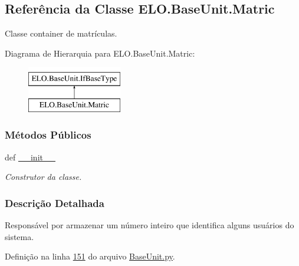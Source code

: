 \hypertarget{classELO_1_1BaseUnit_1_1Matric}{\subsection{Referência da Classe E\-L\-O.\-Base\-Unit.\-Matric}
\label{classELO_1_1BaseUnit_1_1Matric}
}


Classe container de matrículas.  


Diagrama de Hierarquia para E\-L\-O.\-Base\-Unit.\-Matric\-:\begin{figure}[H]
\begin{center}
\leavevmode
\includegraphics[height=2.000000cm]{d6/db2/classELO_1_1BaseUnit_1_1Matric}
\end{center}
\end{figure}
\subsubsection*{Métodos Públicos}
\begin{DoxyCompactItemize}
\item 
def \hyperlink{classELO_1_1BaseUnit_1_1Matric_a050299f6e8d99a530a4598270b93b8d9}{\-\_\-\-\_\-init\-\_\-\-\_\-}
\begin{DoxyCompactList}\small\item\em Construtor da classe. \end{DoxyCompactList}\end{DoxyCompactItemize}


\subsubsection{Descrição Detalhada}
Responsável por armazenar um número inteiro que identifica alguns usuários do sistema. 

Definição na linha \hyperlink{BaseUnit_8py_source_l00151}{151} do arquivo \hyperlink{BaseUnit_8py_source}{Base\-Unit.\-py}.



